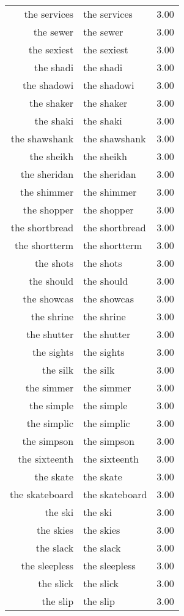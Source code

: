 \begin{table}[ht]
\begin{tabular}{rlr}
  the services & the services & 3.00 \\ 
  the sewer & the sewer & 3.00 \\ 
  the sexiest & the sexiest & 3.00 \\ 
  the shadi & the shadi & 3.00 \\ 
  the shadowi & the shadowi & 3.00 \\ 
  the shaker & the shaker & 3.00 \\ 
  the shaki & the shaki & 3.00 \\ 
  the shawshank & the shawshank & 3.00 \\ 
  the sheikh & the sheikh & 3.00 \\ 
  the sheridan & the sheridan & 3.00 \\ 
  the shimmer & the shimmer & 3.00 \\ 
  the shopper & the shopper & 3.00 \\ 
  the shortbread & the shortbread & 3.00 \\ 
  the shortterm & the shortterm & 3.00 \\ 
  the shots & the shots & 3.00 \\ 
  the should & the should & 3.00 \\ 
  the showcas & the showcas & 3.00 \\ 
  the shrine & the shrine & 3.00 \\ 
  the shutter & the shutter & 3.00 \\ 
  the sights & the sights & 3.00 \\ 
  the silk & the silk & 3.00 \\ 
  the simmer & the simmer & 3.00 \\ 
  the simple & the simple & 3.00 \\ 
  the simplic & the simplic & 3.00 \\ 
  the simpson & the simpson & 3.00 \\ 
  the sixteenth & the sixteenth & 3.00 \\ 
  the skate & the skate & 3.00 \\ 
  the skateboard & the skateboard & 3.00 \\ 
  the ski & the ski & 3.00 \\ 
  the skies & the skies & 3.00 \\ 
  the slack & the slack & 3.00 \\ 
  the sleepless & the sleepless & 3.00 \\ 
  the slick & the slick & 3.00 \\ 
  the slip & the slip & 3.00 \\ 

\end{tabular}
\end{table}
